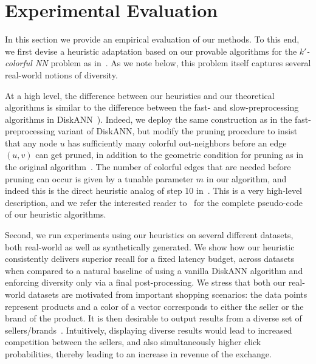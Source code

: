 \newcommand{\diversesearch}{\ensuremath{\mathrm{DiverseSearch}}}
\newcommand{\diverseindex}{\ensuremath{\mathrm{DiverseIndex}}}
\newcommand{\diverseprune}{\ensuremath{\mathrm{DiversePrune}}}
\newcommand{\diversequeue}{\ensuremath{\mathrm{DiversePriorityQueue}}\xspace}
\newcommand{\blockers}{\mathsf{blockers}\xspace}




\section{Experimental Evaluation}
In this section we provide an empirical evaluation of our methods. To this end, we first devise a heuristic adaptation based on our provable algorithms for the {\em $k'$-colorful NN} problem as in~. As we note below, this problem itself captures several real-world notions of diversity. 

At a high level, the difference between our heuristics and our theoretical algorithms is similar to the difference between the fast- and slow-preprocessing algorithms in DiskANN~\cite{jayaram2019diskann,indykxu2024worst}). Indeed, we deploy the same construction as in the fast-preprocessing variant of DiskANN, but modify the pruning procedure to insist that any node $u$ has sufficiently many colorful out-neighbors before an edge $(u,v)$ can get pruned, in addition to the geometric condition for pruning as in the original algorithm~\cite{DiskANN}. The number of colorful edges that  are needed before pruning can occur is given by a tunable parameter $m$ in our algorithm, and indeed this is the direct heuristic analog of step 10 in~.  This is a very high-level description, and we refer the interested reader to~ for the complete pseudo-code of our heuristic algorithms.


Second, we run experiments using our heuristics	on several different datasets, both real-world as well as synthetically generated. We show how our heuristic consistently delivers superior recall for a fixed latency budget, across datasets when compared to a natural baseline of using a vanilla DiskANN algorithm and enforcing diversity only via a final post-processing. We stress that both our real-world datasets are motivated from important shopping scenarios: the data points represent products and a color of a vector corresponds to either the seller or the brand of the product. 
It is then desirable to output results from a diverse set of sellers/brands~\cite{google-div}. Intuitively, displaying diverse results would lead to increased competition between the sellers, and also simultaneously higher click probabilities, thereby leading to an increase in revenue of the exchange.%

